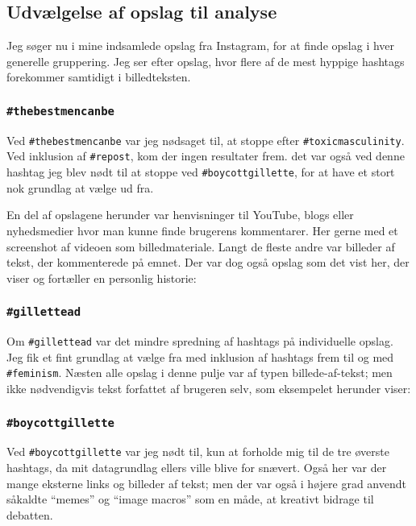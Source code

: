 \subsection{Udvælgelse af opslag til analyse}

Jeg søger nu i mine indsamlede opslag fra Instagram, for at finde 
opslag i hver generelle gruppering. Jeg ser efter opslag, hvor 
flere af de mest hyppige hashtags forekommer samtidigt i
billedteksten.

\subsubsection{\texttt{\#thebestmencanbe}}

Ved \texttt{\#thebestmencanbe} var jeg nødsaget til, at stoppe 
efter \texttt{\#toxicmasculinity}. Ved inklusion af 
\texttt{\#repost}, kom der ingen resultater frem.  det var også 
ved denne hashtag jeg blev nødt til at stoppe ved 
\texttt{\#boycottgillette}, for at have et stort nok grundlag at 
vælge ud fra. 

En del af opslagene herunder var henvisninger til YouTube, blogs 
eller nyhedsmedier hvor man kunne finde brugerens kommentarer.  
Her gerne med et screenshot af videoen som billedmateriale. Langt 
de fleste andre var billeder af tekst, der kommenterede på emnet.  
Der var dog også opslag som det vist her, der viser og fortæller 
en personlig historie:



\subsubsection{\texttt{\#gillettead}}

Om \texttt{\#gillettead} var det mindre spredning af hashtags på 
individuelle opslag. Jeg fik et fint grundlag at vælge fra med 
inklusion af hashtags frem til og med \texttt{\#feminism}. Næsten 
alle opslag i denne pulje var af typen billede-af-tekst; men ikke 
nødvendigvis tekst forfattet af brugeren selv, som eksempelet 
herunder viser:



\subsubsection{\texttt{\#boycottgillette}}

Ved \texttt{\#boycottgillette} var jeg nødt til, kun at forholde 
mig til de tre øverste hashtags, da mit datagrundlag ellers ville 
blive for snævert. Også her var der mange eksterne links og 
billeder af tekst; men der var også i højere grad anvendt såkaldte 
“memes” og “image macros” som en måde, at kreativt bidrage til 
debatten.

